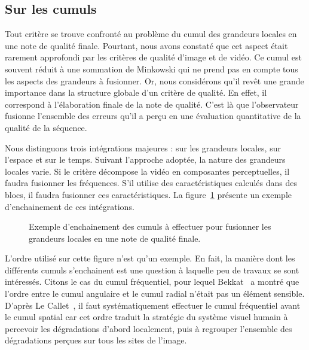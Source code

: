 \subsection{Sur les cumuls}
Tout critère se trouve confronté au problème du cumul des grandeurs locales en une note de qualité finale. Pourtant, nous avons constaté que cet aspect était rarement approfondi par les critères de qualité d'image et de vidéo. Ce cumul est souvent réduit à une sommation de Minkowski qui ne prend pas en compte tous les aspects des grandeurs à fusionner. Or, nous considérons qu'il revêt une grande importance dans la structure globale d'un critère de qualité. En effet, il correspond à l'élaboration finale de la note de qualité. C'est là que l'observateur fusionne l'ensemble des erreurs qu'il a perçu en une évaluation quantitative de la qualité de la séquence.

Nous distinguons trois intégrations majeures : sur les grandeurs locales, sur l'espace et sur le temps. Suivant l'approche adoptée, la nature des grandeurs locales varie. Si le critère décompose la vidéo en composantes perceptuelles, il faudra fusionner les fréquences. S'il utilise des caractéristiques calculés dans des blocs, il faudra fusionner ces caractéristiques. La figure~\ref{fig:figCumul} présente un exemple d'enchainement de ces intégrations.

\begin{figure}[htbp]
	\centering
	\begin{tikzpicture}[text centered, node distance = 3cm]\end{tikzpicture}
	\caption{Exemple d'enchainement des cumuls à effectuer pour fusionner les grandeurs locales en une note de qualité finale.}
	\label{fig:figCumul}
\end{figure}

L'ordre utilisé sur cette figure n'est qu'un exemple. En fait, la manière dont les différents cumuls s'enchainent est une question à laquelle peu de travaux se sont intéressés. Citons le cas du cumul fréquentiel, pour lequel Bekkat~\cite{bekkat-phd} a montré que l'ordre entre le cumul angulaire et le cumul radial n'était pas un élément sensible. D'après Le Callet~\cite{lecallet-phd}, il faut systématiquement effectuer le cumul fréquentiel avant le cumul spatial car cet ordre traduit la stratégie du système visuel humain à percevoir les dégradations d’abord localement, puis à regrouper l’ensemble des dégradations perçues sur tous les sites de l’image.

